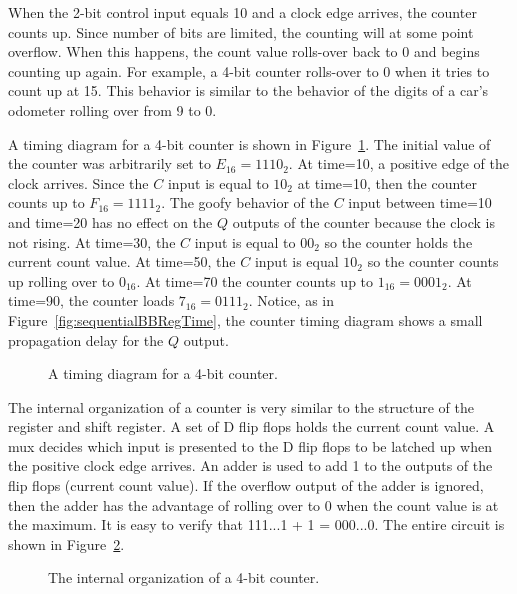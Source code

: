 When the 2-bit control input equals 10 and a clock edge arrives, the
counter counts up.  Since number of bits are limited, the
counting will at some point overflow.  When this happens, the count
value rolls-over back to 0 and begins counting up again.
For example, a 4-bit counter rolls-over to 0 when it tries
to count up at 15.  This behavior is similar to the behavior of the digits of
a car's odometer rolling over from 9 to 0.

A timing diagram for a 4-bit counter is shown in Figure~\ref{fig:sequentialBBCountTime}.
The initial value of the counter was arbitrarily set to $E_{16}=1110_2$.
At time=10, a positive edge of the clock arrives.  Since the $C$ input
is equal to $10_2$ at time=10, then the counter counts up to $F_{16}=1111_2$.
The goofy behavior of the $C$ input between time=10 and time=20 has
no effect on the $Q$ outputs of the counter because the clock is not rising.
At time=30, the $C$ input is equal to $00_2$ so the counter holds the current
count value.  At time=50, the $C$ input is equal $10_2$ so the counter counts up
rolling over to $0_{16}$. At time=70 the counter counts up to $1_{16}=0001_2$.
At time=90, the counter loads $7_{16}=0111_2$.  Notice, as in
Figure~\ref{fig:sequentialBBRegTime}, the counter timing diagram shows a small
propagation delay for the $Q$ output.

\begin{figure}[ht]
    \caption{A timing diagram for a 4-bit counter.}
    \label{fig:sequentialBBCountTime}
\end{figure}

The internal organization of a counter is very similar to the structure of
the register and shift register.  A set of D flip flops holds the current
count value.  A mux decides which input is presented to the D flip flops
to be latched up when the positive clock edge arrives.  An adder is
used to add 1 to the outputs of the flip flops (current count value).
If the overflow output of the adder is ignored, then the adder has the
advantage of rolling over to 0 when the count value is at the
maximum.  It is easy to verify that 111...1 + 1 = 000...0.  The
entire circuit is shown in Figure~\ref{fig:sequentialBBcounter}.

\begin{figure}[ht]
    \caption{The internal organization of a 4-bit counter.}
    \label{fig:sequentialBBcounter}
\end{figure}

